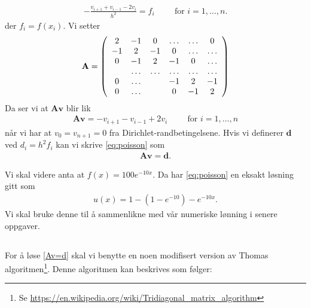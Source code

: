 \documentclass[11pt]{article}
\renewcommand{\vec}{\mathbf} %
\begin{document}
\begin{align}
  - \frac{ v_{i+1} + v_{i-1} - 2v_i }{ h^2 } =
  f_i\hspace{1cm}\text{for } i = 1,\dots,n.
\end{align}
der $f_i = f(x_i)$. Vi setter 
\begin{align*}
      {\bf A} = \left(\begin{array}{cccccc}
                           2& -1& 0 &\dots   & \dots &0 \\
                           -1 & 2 & -1 &0 &\dots &\dots \\
                           0&-1 &2 & -1 & 0 & \dots \\
                           & \dots   & \dots &\dots   &\dots & \dots \\
                           0&\dots   &  &-1 &2& -1 \\
                           0&\dots    &  & 0  &-1 & 2 \\
                      \end{array} \right)
\end{align*}
Da ser vi at $\vec A \vec v$ blir lik 
\begin{align*}
  \vec A \vec v = -v_{i+1} - v_{i-1} + 2v_i\hspace{1cm}\text{for } i = 1,\dots,n
\end{align*}
når vi har at $v_0 = v_{n+1} = 0$ fra Dirichlet-randbetingelsene. Hvis
vi definerer $\vec d$ ved $d_i = h^2f_i$ kan vi skrive
\eqref{eq:poisson} som 
\begin{align}
  \vec A \vec v = \vec d.\label{Av=d}
\end{align}
 

Vi skal videre anta at $f(x) = 100 e^{-10x}$. Da har
\eqref{eq:poisson} en eksakt løsning gitt som
 \begin{align}
u(x) = 1 -\left(1-e^{-10}\right) - e^{-10x}.\label{eq:exact}
\end{align} 
Vi skal bruke denne til å
sammenlikne med vår numeriske lønning i senere oppgaver.

\subsection{}
For å løse \eqref{Av=d} skal vi benytte en noen modifisert version av
Thomas algoritmen\footnote{Se
  \url{https://en.wikipedia.org/wiki/Tridiagonal_matrix_algorithm}}. Denne
algoritmen kan beskrives som følger: 
\end{document}
